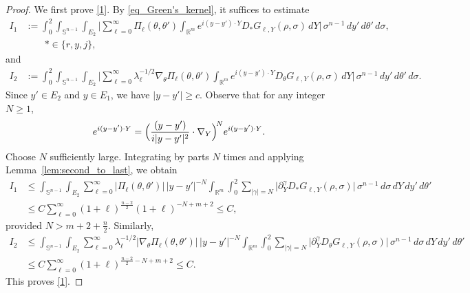 \documentclass[12pt]{amsart}
\begin{document}
\begin{proof}
We first prove \eqref{1}. By \eqref{eq_Green's_kernel}, it suffices to estimate
\begin{align*}
    I_1&:=\int_0^2 \int_{\mathbb{S}^{n-1}} \int_{E_2} \biggl|\sum_{\ell=0}^\infty \Pi_{\ell}(\theta, \theta') \int_{\mathbb{R}^m} e^{i(y-y') \cdot Y} D_* G_{\ell, Y}(\rho, \sigma) \, dY\biggr| \, \sigma^{n-1} \, dy' \, d\theta' \, d\sigma,\\
    &\qquad *\in\{r, y,j\},
\end{align*}
and
\begin{align*}
    I_2&:=\int_0^2 \int_{\mathbb{S}^{n-1}} \int_{E_2} \biggl|\sum_{\ell=0}^\infty \lambda_\ell^{-1/2}\nabla_\theta\Pi_{\ell}(\theta, \theta') \int_{\mathbb{R}^m} e^{i(y-y') \cdot Y} D_\theta G_{\ell, Y}(\rho, \sigma) \, dY\biggr| \, \sigma^{n-1} \, dy' \, d\theta' \, d\sigma.
\end{align*}
Since $y'\in E_2$ and $y\in E_1$, we have $|y-y'|\ge c$. Observe that for any integer $N\ge 1$,
\begin{equation*}
    e^{i(y-y')\cdot Y} = \Bigl(\frac{(y-y')}{i|y-y'|^2} \cdot \nabla_Y \Bigr)^{\!N} e^{i(y-y')\cdot Y}.
\end{equation*}
Choose $N$ sufficiently large. Integrating by parts $N$ times and applying Lemma~\ref{lem:second_to_last}, we obtain
\begin{align*}
    I_1 &\le  \int_{\mathbb{S}^{n-1}} \int_{E_2} \sum_{\ell=0}^\infty |\Pi_{\ell}(\theta, \theta')| \, |y-y'|^{-N}\int_{\mathbb{R}^m} \int_0^2 \sum_{|\gamma| =N} \bigl|\partial_Y^{\gamma} D_* G_{\ell, Y}(\rho, \sigma)\bigr| \, \sigma^{n-1} \, d\sigma \, dY \, dy' \, d\theta' \\
    &\le C \sum_{\ell=0}^\infty (1+\ell)^{\frac{n-2}{2}} (1+\ell)^{-N+m+2}\le C,
\end{align*}
provided $N>m+2+\frac{n}{2}$. Similarly,
\begin{align*}
    I_2 &\le  \int_{\mathbb{S}^{n-1}} \int_{E_2} \sum_{\ell=0}^\infty \lambda_\ell^{-1/2}|\nabla_\theta\Pi_{\ell}(\theta, \theta')| \, |y-y'|^{-N} \int_{\mathbb{R}^m} \int_0^2 \sum_{|\gamma|=N}\bigl|\partial_Y^\gamma D_\theta G_{\ell, Y}(\rho, \sigma)\bigr| \, \sigma^{n-1} \, d\sigma \, dY \, dy' \, d\theta' \\
    &\le C \sum_{\ell=0}^\infty (1+\ell)^{\frac{n-2}{2}-N+m+2}\le C.
\end{align*}
This proves \eqref{1}.


\end{proof}
\end{document}
